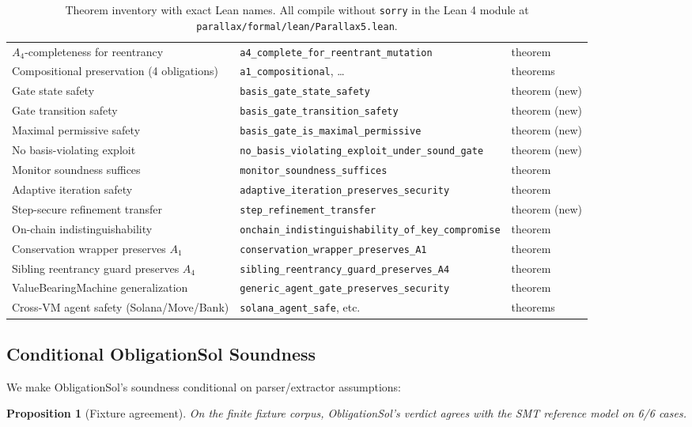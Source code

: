 \documentclass[11pt,a4paper]{article}
\newtheorem{proposition}[theorem]{Proposition}
\begin{document}
\begin{table}[h]
\begin{tabular}{lll}
$A_4$-completeness for reentrancy & \texttt{a4\_complete\_for\_reentrant\_mutation} & theorem \\
Compositional preservation (4 obligations) & \texttt{a1\_compositional}, \ldots & theorems \\
Gate state safety & \texttt{basis\_gate\_state\_safety} & theorem (new) \\
Gate transition safety & \texttt{basis\_gate\_transition\_safety} & theorem (new) \\
Maximal permissive safety & \texttt{basis\_gate\_is\_maximal\_permissive} & theorem (new) \\
No basis-violating exploit & \texttt{no\_basis\_violating\_exploit\_under\_sound\_gate} & theorem (new) \\
Monitor soundness suffices & \texttt{monitor\_soundness\_suffices} & theorem \\
Adaptive iteration safety & \texttt{adaptive\_iteration\_preserves\_security} & theorem \\
Step-secure refinement transfer & \texttt{step\_refinement\_transfer} & theorem (new) \\
On-chain indistinguishability & \texttt{onchain\_indistinguishability\_of\_key\_compromise} & theorem \\
Conservation wrapper preserves $A_1$ & \texttt{conservation\_wrapper\_preserves\_A1} & theorem \\
Sibling reentrancy guard preserves $A_4$ & \texttt{sibling\_reentrancy\_guard\_preserves\_A4} & theorem \\
ValueBearingMachine generalization & \texttt{generic\_agent\_gate\_preserves\_security} & theorem \\
Cross-VM agent safety (Solana/Move/Bank) & \texttt{solana\_agent\_safe}, etc. & theorems \\
\bottomrule
\end{tabular}
\caption{Theorem inventory with exact Lean names. All compile without \texttt{sorry} in the Lean 4 module at \texttt{parallax/formal/lean/Parallax5.lean}.}\label{tab:thm-inventory}
\end{table}

\subsection{Conditional ObligationSol Soundness}

We make ObligationSol's soundness conditional on parser/extractor assumptions:

\begin{proposition}[Fixture agreement]
On the finite fixture corpus, ObligationSol's verdict agrees with the SMT reference model on 6/6 cases.
\end{proposition}
\end{document}
